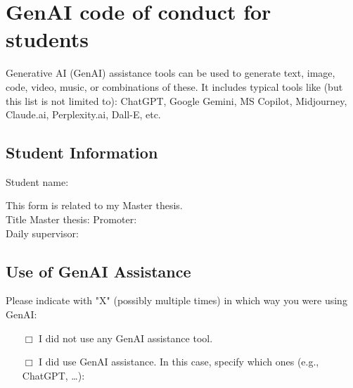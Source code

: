 \chapter{GenAI code of conduct for students}

Generative AI (GenAI) assistance tools can be used to generate text, image, code, video, music, or combinations of these. It includes typical tools like (but this list is not limited to): ChatGPT, Google Gemini, MS Copilot, Midjourney, Claude.ai, Perplexity.ai, Dall-E, etc.

\section*{Student Information}
\begin{tabbing}
\makeatletter%
Student name: \@forenameA \ \@surnameA
\makeatother
\end{tabbing}

This form is related to my Master thesis. \\
\makeatletter%
Title Master thesis: \@title \hspace{1cm} Promoter: \underline{\hspace{5cm}}\\
Daily supervisor: \underline{\hspace{5cm}}
\makeatother


\section*{Use of GenAI Assistance}
Please indicate with "X" (possibly multiple times) in which way you were using GenAI:

\begin{itemize}
    \item[$\Box$] I did not use any GenAI assistance tool.
    \item[$\Box$] I did use GenAI assistance. In this case, specify which ones (e.g., ChatGPT, \ldots): \underline{\hspace{5cm}}
\end{itemize}

